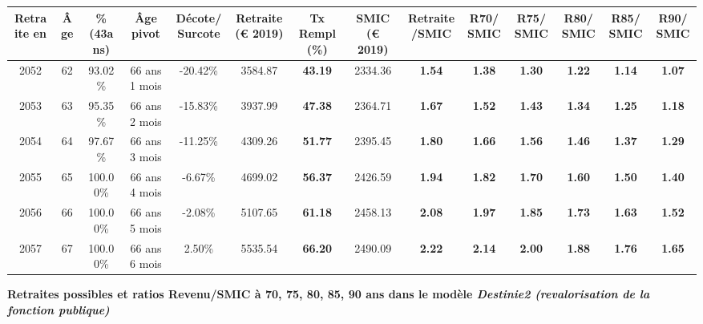 \begin{adjustbox}{max width=\textwidth} 
\begin{tabular}[htb]{|c|c||c|c|c||c|c||c|c||c|c|c|c|c|} 
\hline 
 Retraite en &  Âge &  \%(43ans) &  Âge pivot &  Décote/Surcote &  Retraite (\euro{} 2019) &  Tx Rempl(\%) &  SMIC (\euro{} 2019) &  Retraite/SMIC &  R70/SMIC &  R75/SMIC &  R80/SMIC &  R85/SMIC &  R90/SMIC \\ 
\hline \hline 
 2052 &  62 &  93.02\% &  66 ans 1 mois &  -20.42\% &  3584.87 &  {\bf 43.19} &  2334.36 &  {\bf 1.54} &  {\bf 1.38} &  {\bf 1.30} &  {\bf 1.22} &  {\bf 1.14} &  {\bf 1.07} \\ 
\hline 
 2053 &  63 &  95.35\% &  66 ans 2 mois &  -15.83\% &  3937.99 &  {\bf 47.38} &  2364.71 &  {\bf 1.67} &  {\bf 1.52} &  {\bf 1.43} &  {\bf 1.34} &  {\bf 1.25} &  {\bf 1.18} \\ 
\hline 
 2054 &  64 &  97.67\% &  66 ans 3 mois &  -11.25\% &  4309.26 &  {\bf 51.77} &  2395.45 &  {\bf 1.80} &  {\bf 1.66} &  {\bf 1.56} &  {\bf 1.46} &  {\bf 1.37} &  {\bf 1.29} \\ 
\hline 
 2055 &  65 &  100.00\% &  66 ans 4 mois &  -6.67\% &  4699.02 &  {\bf 56.37} &  2426.59 &  {\bf 1.94} &  {\bf 1.82} &  {\bf 1.70} &  {\bf 1.60} &  {\bf 1.50} &  {\bf 1.40} \\ 
\hline 
 2056 &  66 &  100.00\% &  66 ans 5 mois &  -2.08\% &  5107.65 &  {\bf 61.18} &  2458.13 &  {\bf 2.08} &  {\bf 1.97} &  {\bf 1.85} &  {\bf 1.73} &  {\bf 1.63} &  {\bf 1.52} \\ 
\hline 
 2057 &  67 &  100.00\% &  66 ans 6 mois &  2.50\% &  5535.54 &  {\bf 66.20} &  2490.09 &  {\bf 2.22} &  {\bf 2.14} &  {\bf 2.00} &  {\bf 1.88} &  {\bf 1.76} &  {\bf 1.65} \\ 
\hline 
\hline 
\end{tabular} 
\end{adjustbox} 
 
 \vspace{0.1cm} 
{\bf \noindent Retraites possibles et ratios Revenu/SMIC à 70, 75, 80, 85, 90 ans dans le modèle \emph{Destinie2 (revalorisation de la fonction publique)}}  
 

